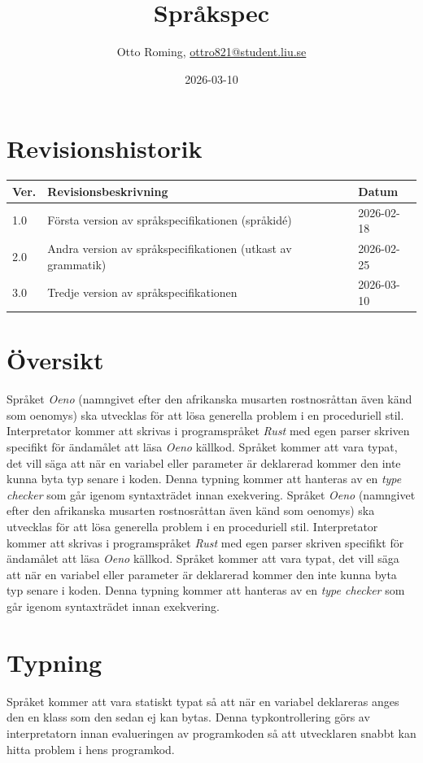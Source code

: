 \documentclass{TDP003mall}
\author{Otto Roming, \url{ottro821@student.liu.se}}
\title{Språkspec}
\date{2026-03-10}
\begin{document}
\projectpage
\section{Revisionshistorik}
\begin{table}[!h]
\begin{tabularx}{\linewidth}{|l|X|l|}
\hline
Ver. & Revisionsbeskrivning & Datum \\\hline
1.0 & Första version av språkspecifikationen (språkidé) & 2026-02-18 \\\hline
2.0 & Andra version av språkspecifikationen (utkast av grammatik) & 2026-02-25 \\\hline
3.0 & Tredje version av språkspecifikationen & 2026-03-10 \\\hline
\end{tabularx}
\end{table}

\section{Översikt}
Språket \textit{Oeno} (namngivet efter den afrikanska musarten rostnosråttan även känd som oenomys\cite{renaud_size_1999}) ska utvecklas för att lösa generella problem i en proceduriell stil. Interpretator kommer att skrivas i programspråket \textit{Rust} med egen parser skriven specifikt för ändamålet att läsa \textit{Oeno} källkod. Språket kommer att vara typat, det vill säga att när en variabel eller parameter är deklarerad kommer den inte kunna byta typ senare i koden.  Denna typning kommer att hanteras av en \textit{type checker} som går igenom syntaxträdet innan exekvering.
Språket \textit{Oeno} (namngivet efter den afrikanska musarten rostnosråttan även känd som oenomys\cite{renaud_size_1999}) ska utvecklas för att lösa generella problem i en proceduriell stil. Interpretator kommer att skrivas i programspråket \textit{Rust} med egen parser skriven specifikt för ändamålet att läsa \textit{Oeno} källkod. Språket kommer att vara typat, det vill säga att när en variabel eller parameter är deklarerad kommer den inte kunna byta typ senare i koden.  Denna typning kommer att hanteras av en \textit{type checker} som går igenom syntaxträdet innan exekvering.

\section{Typning}
Språket kommer att vara statiskt typat så att när en variabel deklareras anges den en klass som den sedan ej kan bytas. Denna typkontrollering görs av interpretatorn innan evalueringen av programkoden så att utvecklaren snabbt kan hitta problem i hens programkod.
\end{document}
